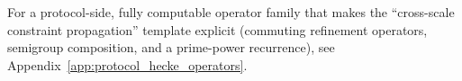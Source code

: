 \begin{remark}\label{rem:protocol_hecke_operator_template}
\AuditTag For a protocol-side, fully computable operator family that makes the ``cross-scale constraint propagation'' template explicit (commuting refinement operators, semigroup composition, and a prime-power recurrence), see Appendix~\ref{app:protocol_hecke_operators}.
\end{remark}



